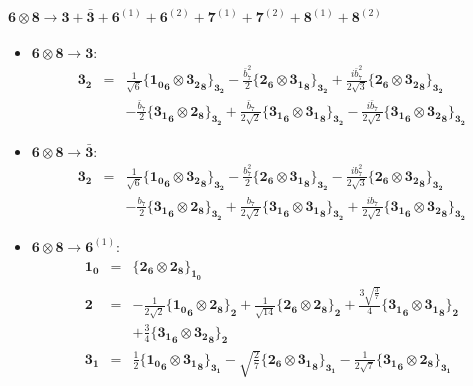\documentclass[english]{article}
\newcommand{\subcg}[3]{\big\{ {#1}\otimes{#2}\big\}^{}_{#3}}
\newcommand{\rep}[1]{\mathbf{#1}}
\begin{document}
\paragraph*{\Large $\rep{6}\otimes\rep{8}\to\rep{3}+\rep{\bar{3}}+\rep{6}^{(1)}+\rep{6}^{(2)}+\rep{7}^{(1)}+\rep{7}^{(2)}+\rep{8}^{(1)}+\rep{8}^{(2)}$}
\begin{itemize}
\item $\rep{6}\otimes\rep{8}\to\rep{3}$:
\begin{eqnarray*}
\rep{3_2} &=& \frac{1}{\sqrt{6}}\subcg{\rep{1_0}_{\rep{6}}}{\rep{3_2}_{\rep{8}}}{\rep{3_2}}-\frac{\bar{b}_7^2}{2}\subcg{\rep{2}_{\rep{6}}}{\rep{3_1}_{\rep{8}}}{\rep{3_2}}+\frac{i \bar{b}_7^2}{2 \sqrt{3}}\subcg{\rep{2}_{\rep{6}}}{\rep{3_2}_{\rep{8}}}{\rep{3_2}} \\ 
 & & -\frac{\bar{b}_7}{2}\subcg{\rep{3_1}_{\rep{6}}}{\rep{2}_{\rep{8}}}{\rep{3_2}}+\frac{\bar{b}_7}{2 \sqrt{2}}\subcg{\rep{3_1}_{\rep{6}}}{\rep{3_1}_{\rep{8}}}{\rep{3_2}}-\frac{i \bar{b}_7}{2 \sqrt{2}}\subcg{\rep{3_1}_{\rep{6}}}{\rep{3_2}_{\rep{8}}}{\rep{3_2}}
\end{eqnarray*}
\item $\rep{6}\otimes\rep{8}\to\rep{\bar{3}}$:
\begin{eqnarray*}
\rep{3_2} &=& \frac{1}{\sqrt{6}}\subcg{\rep{1_0}_{\rep{6}}}{\rep{3_2}_{\rep{8}}}{\rep{3_2}}-\frac{b_7^2}{2}\subcg{\rep{2}_{\rep{6}}}{\rep{3_1}_{\rep{8}}}{\rep{3_2}}-\frac{i b_7^2}{2 \sqrt{3}}\subcg{\rep{2}_{\rep{6}}}{\rep{3_2}_{\rep{8}}}{\rep{3_2}} \\ 
 & & -\frac{b_7}{2}\subcg{\rep{3_1}_{\rep{6}}}{\rep{2}_{\rep{8}}}{\rep{3_2}}+\frac{b_7}{2 \sqrt{2}}\subcg{\rep{3_1}_{\rep{6}}}{\rep{3_1}_{\rep{8}}}{\rep{3_2}}+\frac{i b_7}{2 \sqrt{2}}\subcg{\rep{3_1}_{\rep{6}}}{\rep{3_2}_{\rep{8}}}{\rep{3_2}}
\end{eqnarray*}
\item $\rep{6}\otimes\rep{8}\to\rep{6}^{(1)}$:
\begin{eqnarray*}
\rep{1_0} &=& \subcg{\rep{2}_{\rep{6}}}{\rep{2}_{\rep{8}}}{\rep{1_0}}
\\
\rep{2} &=& -\frac{1}{2 \sqrt{2}}\subcg{\rep{1_0}_{\rep{6}}}{\rep{2}_{\rep{8}}}{\rep{2}}+\frac{1}{\sqrt{14}}\subcg{\rep{2}_{\rep{6}}}{\rep{2}_{\rep{8}}}{\rep{2}}+\frac{3 \sqrt{\frac{3}{7}}}{4}\subcg{\rep{3_1}_{\rep{6}}}{\rep{3_1}_{\rep{8}}}{\rep{2}} \\ 
 & & +\frac{3}{4}\subcg{\rep{3_1}_{\rep{6}}}{\rep{3_2}_{\rep{8}}}{\rep{2}}
\\
\rep{3_1} &=& \frac{1}{2}\subcg{\rep{1_0}_{\rep{6}}}{\rep{3_1}_{\rep{8}}}{\rep{3_1}}-\sqrt{\frac{2}{7}}\subcg{\rep{2}_{\rep{6}}}{\rep{3_1}_{\rep{8}}}{\rep{3_1}}-\frac{1}{2 \sqrt{7}}\subcg{\rep{3_1}_{\rep{6}}}{\rep{2}_{\rep{8}}}{\rep{3_1}} \\ 

\end{eqnarray*}
\end{itemize}
\end{document}
